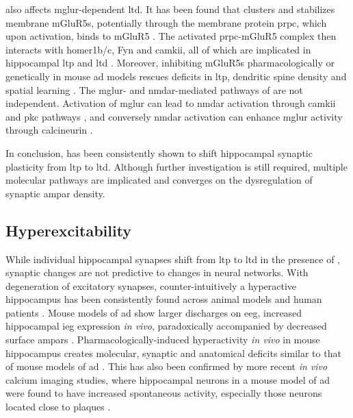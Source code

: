 \abeta{} also affects \gls{mglur}-dependent \gls{ltd}. It has been found that \abeta{} clusters and stabilizes membrane mGluR5s, potentially through the membrane protein \gls{prpc}, which upon \abeta{} activation, binds to mGluR5 \citep{renner10, um13}. The activated \gls{prpc}-mGluR5 complex then interacts with homer1b/c, Fyn and \gls{camkii}, all of which are implicated in hippocampal \gls{ltp} and \gls{ltd} \citep{raka15, haas16}. Moreover, inhibiting mGluR5s pharmacologically or genetically in mouse \gls{ad} models rescues deficits in \gls{ltp}, dendritic spine density and spatial learning \citep{rammes11, hu14, um13, hamilton14}. The \gls{mglur}- and \gls{nmdar}-mediated pathways of \abeta{} are not independent. Activation of \gls{mglur} can lead to \gls{nmdar} activation through \gls{camkii} and \gls{pkc} pathways \citep{chen11, jin15}, and conversely \gls{nmdar} activation can enhance \gls{mglur} activity through calcineurin \citep{alagarsamy99, alagarsamy05}. 

In conclusion, \abeta{} has been consistently shown to shift hippocampal synaptic plasticity from \gls{ltp} to \gls{ltd}. Although further investigation is still required, multiple molecular pathways are implicated and converges on the dysregulation of synaptic \gls{ampar} density. 

\subsection{Hyperexcitability}

While individual hippocampal synapses shift from \gls{ltp} to \gls{ltd} in the presence of \abeta{}, synaptic changes are not predictive to changes in neural networks. With degeneration of excitatory synapses, counter-intuitively a hyperactive hippocampus has been consistently found across animal models and human patients \citep{palop16}. Mouse models of \gls{ad} show larger discharges on \gls{eeg}, increased hippocampal \gls{ieg} expression \textit{in vivo}, paradoxically accompanied by decreased surface \glspl{ampar} \citep{palop07, harris10, born14}. Pharmacologically-induced hyperactivity \textit{in vivo} in mouse hippocampus creates molecular, synaptic and anatomical deficits similar to that of mouse models of \gls{ad} \citep{palop07}. This has also been confirmed by more recent \textit{in vivo} calcium imaging studies, where hippocampal neurons in a mouse model of \gls{ad} were found to have increased spontaneous activity, especially those neurons located close to plaques \citep{busche12}. 


